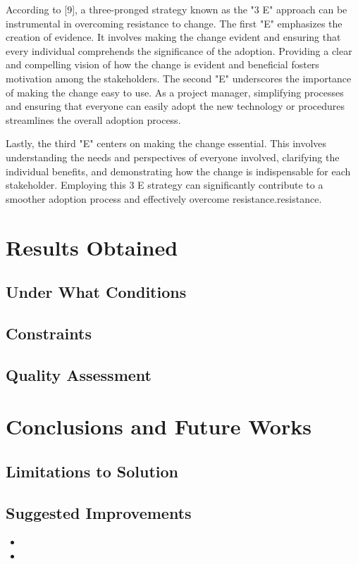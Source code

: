 \documentclass{article}
\begin{document}
\noindent According to [9], a three-pronged strategy known as the "3 E" approach can be instrumental in overcoming resistance to change. The first "E" emphasizes the creation of evidence. It involves making the change evident and ensuring that every individual comprehends the significance of the adoption. Providing a clear and compelling vision of how the change is evident and beneficial fosters motivation among the stakeholders. The second "E" underscores the importance of making the change easy to use. As a project manager, simplifying processes and ensuring that everyone can easily adopt the new technology or procedures streamlines the overall adoption process. \newline

\noindent Lastly, the third "E" centers on making the change essential. This involves understanding the needs and perspectives of everyone involved, clarifying the individual benefits, and demonstrating how the change is indispensable for each stakeholder. Employing this 3 E strategy can significantly contribute to a smoother adoption process and effectively overcome resistance.resistance.

\section{Results Obtained}
\subsection{Under What Conditions}
\lipsum[21]

\subsection{Constraints}
\lipsum[22]

\subsection{Quality Assessment}
\lipsum[23]

\section{Conclusions and Future Works}
\subsection{Limitations to Solution}
\lipsum[24]

\subsection{Suggested Improvements}
\begin{itemize}
  \item \lipsum[25]
  \item \lipsum[26]
\end{itemize}
\end{document}
